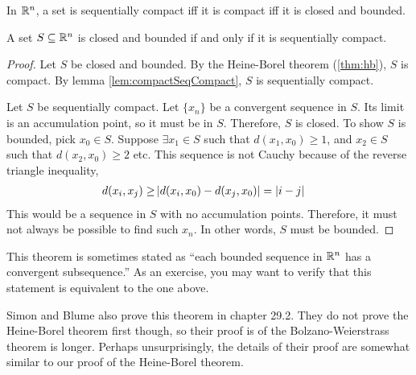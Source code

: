 In $\mathbb{R}^n$, a set is sequentially compact iff it is compact iff it is
closed and bounded.
\begin{theorem} \label{thm:bw}
  A set $S \subseteq \mathbb{R}^n$ is closed and bounded if and only if it is
  sequentially compact. 
\end{theorem}
\begin{proof}
  Let $S$ be closed and bounded. By the Heine-Borel theorem
  (\ref{thm:hb}), $S$ is compact. By lemma
  \ref{lem:compactSeqCompact}, $S$ is sequentially compact. 

  Let $S$ be sequentially compact. Let $\{x_n\}$ be a convergent
  sequence in $S$. Its limit is an accumulation point, so it must be
  in $S$. Therefore, $S$ is closed. To show $S$ is bounded, pick $x_0
  \in S$. Suppose $\exists x_1 \in S$ such that $d(x_1, x_0) \geq 1$,
  and $x_2 \in S$ such that $d(x_2, x_0) \geq 2$ etc. This sequence is
  not Cauchy because of the reverse triangle inequality,  
  \begin{align*}
    d(x_i,x_j) \geq & \left\vert {d(x_i,x_0) - d(x_j,x_0) } \right\vert = |i-j|
  \end{align*}  
  This would be a sequence in $S$ with no accumulation
  points. Therefore, it must not always be possible to find such
  $x_n$. In other words, $S$ must be bounded.
\end{proof}

\begin{remark}
  This theorem is sometimes stated as ``each bounded sequence in $\mathbb{R}^n$
  has a convergent subsequence.'' As an exercise, you may want to
  verify that this statement is equivalent to the one above.
\end{remark}
Simon and Blume also prove this theorem in chapter 29.2. They do not
prove the Heine-Borel theorem first though, so their proof is of the
Bolzano-Weierstrass theorem is longer. Perhaps unsurprisingly, the
details of their proof are somewhat similar to our proof of the
Heine-Borel theorem.


